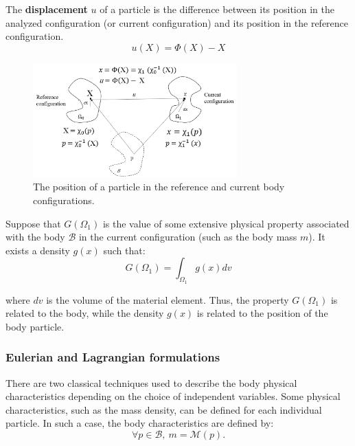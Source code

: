  The \textbf{displacement} $u$ of a particle is the difference between its position in the analyzed configuration (or current configuration) and its position in the reference configuration.
 \begin{equation}
 u(X) = \Phi(X) - X
 \end{equation}


\begin{figure}
\begin{center}
\includegraphics[width=0.7\textwidth,keepaspectratio]{figures/referenceFig.png} 
\caption{ The position of a particle in the reference and current body configurations.}
\label{reference_config_theory}
\end{center}
\end{figure}

Suppose that $G(\Omega_1)$ is the value of some extensive physical property  associated with the body $\mathcal{B}$ in the current configuration (such as the body mass $m$). It exists a density $g(x)$ such that:
\begin{equation}
 G(\Omega_1) = \int_{\Omega_1} g(x)dv
\end{equation} 

 where $dv$ is the volume of the material element.
 Thus, the property $G(\Omega_1)$ is related to the body, while the density $g(x)$ is related to the position of the body particle.
\subsubsection*{Eulerian and Lagrangian formulations}
There are two classical techniques used to describe the body physical characteristics depending on the choice of independent variables.
 Some physical characteristics, such as the mass density, can be defined for each individual particle. In such a case, the body characteristics are defined by: 
\begin{equation}
\forall	p \in \mathcal{B}, \ m = \mathcal{M}(p).
\end{equation} 

